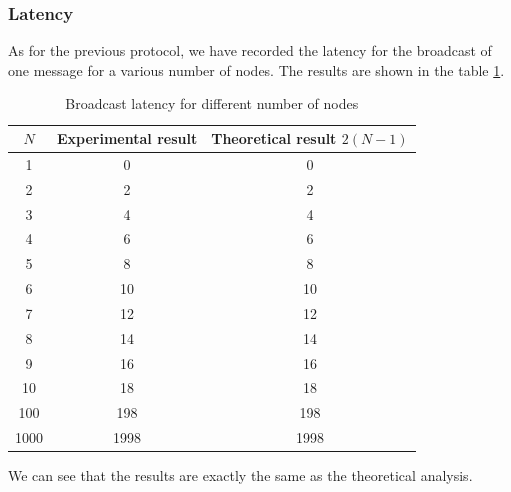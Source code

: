 \documentclass[a4paper]{article}
\begin{document}
\subsubsection{Latency}
As for the previous protocol, we have recorded the latency for the broadcast of
one message for a various number of nodes. The results are shown in the table
\ref{table:th}.
\begin{table}[H]
\centering
\begin{tabular}{|c|c|c|}
    \hline
    $N$  & Experimental result & Theoretical result $2(N-1)$ \\
    \hline
    1     & 0   & 0    \\
    2     & 2   & 2   \\
    3     & 4   & 4   \\
    4     & 6   & 6   \\
    5     & 8   & 8   \\
    6     & 10  & 10  \\
    7     & 12  & 12  \\
    8     & 14  & 14  \\
    9     & 16  & 16  \\
    10    & 18  & 18  \\
    100   & 198 & 198  \\
    1000  & 1998   & 1998  \\
    \hline
\end{tabular}
\caption{Broadcast latency for different number of nodes}
\label{table:th}
\end{table}
We can see that the results are exactly the same as the theoretical analysis.
\end{document}
